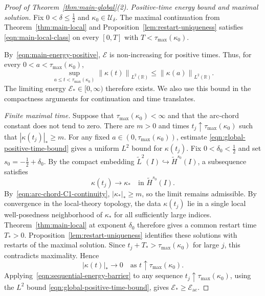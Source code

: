 \documentclass[11pt,reqno]{amsart}
\theoremstyle{plain}
\theoremstyle{definition}
\numberwithin{equation}{section}
\newcommand{\mc}[1]{\mathcal{#1}}
\newcommand{\wt}[1]{\widetilde{#1}}
\newcommand{\abs}[1]{\left\lvert #1 \right\rvert}
\newcommand{\norm}[1]{\left\lVert #1 \right\rVert}
\newcommand{\R}{\mathbb{R}}
\newcommand{\thi}[1]{\wt H^{#1}(I)}
\begin{document}
\begin{proof}[Proof of Theorem~\ref{thm:main-global}(2)]
\emph{Positive-time energy bound and maximal solution.}
Fix $0<\delta\le\frac12$ and $\kappa_0\in\mc U_\delta$. The maximal
continuation from Theorem~\ref{thm:main-local} and
Proposition~\ref{lem:restart-uniqueness} satisfies
\eqref{eqn:main-local-class} on every $[0,T]$ with
$T<\tau_{\text{max}}(\kappa_0)$.

By~\eqref{eqn:main-energy-positive}, $\mc E$ is non-increasing for
positive times. Thus, for every $0<a<\tau_{\text{max}}(\kappa_0)$,
\begin{equation}\label{eqn:global-positive-time-bound}
    \sup_{a\le t<\tau_{\text{max}}(\kappa_0)}
    \norm{\kappa(t)}_{L^2(\R)}
    \le\norm{\kappa(a)}_{L^2(\R)}.
\end{equation}
The limiting energy $\mc E_*\in[0,\infty)$ therefore exists. We also use
this bound in the compactness arguments for continuation and time translates.

\emph{Finite maximal time.}
Suppose that $\tau_{\text{max}}(\kappa_0)<\infty$ and that the arc-chord
constant does not tend to zero. There are $m>0$ and times
$t_j\uparrow\tau_{\text{max}}(\kappa_0)$ such that
$\abs{\kappa(t_j)}_*\ge m$. For any fixed
$a\in(0,\tau_{\text{max}}(\kappa_0))$, estimate
\eqref{eqn:global-positive-time-bound} gives a uniform $L^2$ bound for
$\kappa(t_j)$. Fix $0<\delta_0<\frac12$ and set $s_0=-\frac12+\delta_0$.
By the compact embedding $\wt L^2(I)\hookrightarrow\thi{s_0}$, a subsequence
satisfies
\begin{equation*}
    \kappa(t_j)\longrightarrow\kappa_*
    \quad\text{in }\thi{s_0}.
\end{equation*}
By~\eqref{eqn:arc-chord-C1-continuity}, $\abs{\kappa_*}_*\ge m$, so the
limit remains admissible. By convergence in the local-theory topology,
the data $\kappa(t_j)$ lie in a single local well-posedness neighborhood of $\kappa_*$
for all sufficiently large indices. Theorem~\ref{thm:main-local} at exponent $\delta_0$ therefore gives a
common restart time $T_*>0$.
Proposition~\ref{lem:restart-uniqueness} identifies these solutions
with restarts of the maximal solution. Since
$t_j+T_*>\tau_{\text{max}}(\kappa_0)$ for large $j$, this contradicts
maximality. Hence
\begin{equation}
    \abs{\kappa(t)}_*\longrightarrow0
    \quad\text{as }t\uparrow\tau_{\text{max}}(\kappa_0).
\end{equation}
Applying~\eqref{eqn:sequential-energy-barrier} to any sequence
$t_j\uparrow\tau_{\text{max}}(\kappa_0)$, using the $L^2$ bound
\eqref{eqn:global-positive-time-bound}, gives
$\mc E_*\ge\mc E_{\mathrm{ac}}$.


\end{proof}
\end{document}
